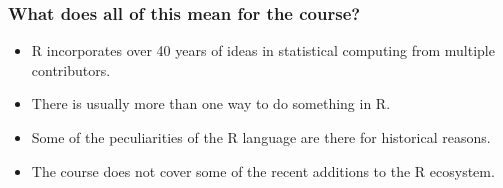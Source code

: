 \documentclass[svgnames, aspectratio=169]{beamer}
\begin{document}
%
%
    
%
%
%    
%
%    
%  

\begin{frame}
  \frametitle{What does all of this mean for the course?}

  \begin{itemize}
  \item R incorporates over 40 years of ideas in statistical computing
    from multiple contributors.
  \item There is usually more than one way to do something in R.
  \item Some of the peculiarities of the R language are there for
    historical reasons.
  \item The course does not cover some of the recent additions to the
    R ecosystem.
  \end{itemize}

\end{frame}
    
\end{document}
